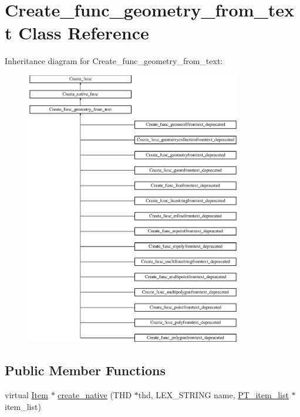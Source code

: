 \hypertarget{classCreate__func__geometry__from__text}{}\section{Create\+\_\+func\+\_\+geometry\+\_\+from\+\_\+text Class Reference}
\label{classCreate__func__geometry__from__text}
Inheritance diagram for Create\+\_\+func\+\_\+geometry\+\_\+from\+\_\+text\+:\begin{figure}[H]
\begin{center}
\leavevmode
\includegraphics[height=12.000000cm]{classCreate__func__geometry__from__text}
\end{center}
\end{figure}
\subsection*{Public Member Functions}
\begin{DoxyCompactItemize}
\item 
virtual \mbox{\hyperlink{classItem}{Item}} $\ast$ \mbox{\hyperlink{classCreate__func__geometry__from__text_aa8fb6a66aca86650e8f96dafcfcd7463}{create\+\_\+native}} (T\+HD $\ast$thd, L\+E\+X\+\_\+\+S\+T\+R\+I\+NG name, \mbox{\hyperlink{classPT__item__list}{P\+T\+\_\+item\+\_\+list}} $\ast$item\+\_\+list)
\end{DoxyCompactItemize}
